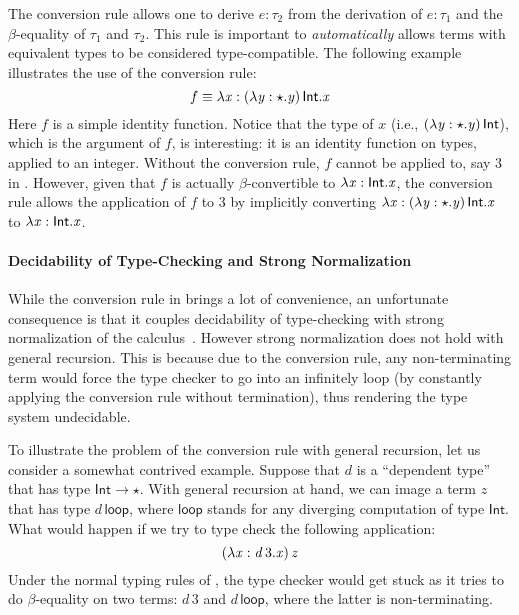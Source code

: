 
The conversion rule allows one to derive $e:\tau_{{\mathrm{2}}}$ from the
derivation of $e:\tau_{{\mathrm{1}}}$ and the $\beta$-equality of $\tau_{{\mathrm{1}}}$ and
$\tau_{{\mathrm{2}}}$. This rule is important to \emph{automatically} allows terms
with equivalent types to be considered type-compatible.  The following
example illustrates the use of the conversion rule:
\[
f \equiv \lambda  \mathit{x}  :  (  \lambda  \mathit{y}  :  \star  .  \mathit{y}  ) \, \mathsf{Int}  .  \mathit{x}
\]
Here $f$ is a simple identity function. Notice that the type of $x$
(i.e., $(  \lambda  \mathit{y}  :  \star  .  \mathit{y}  ) \, \mathsf{Int}$), which is the argument of $f$, is
interesting: it is an identity function on types, applied to an
integer.  Without the conversion rule, $f$ cannot be applied to, say
$3$ in \coc. However, given that $f$ is actually $\beta$-convertible
to $\lambda  \mathit{x}  :  \mathsf{Int}  .  \mathit{x}$, the conversion rule allows the application of $f$
to $3$ by implicitly converting $\lambda  \mathit{x}  :  (  \lambda  \mathit{y}  :  \star  .  \mathit{y}  ) \, \mathsf{Int}  .  \mathit{x}$ to
$\lambda  \mathit{x}  :  \mathsf{Int}  .  \mathit{x}$.

\paragraph{Decidability of Type-Checking and Strong Normalization} 
While the conversion rule in \coc brings a lot of convenience, an
unfortunate consequence is that it couples decidability of
type-checking with strong normalization of the
calculus~\cite{coc:decidability}.  However strong normalization does
not hold with general recursion. This is because due to the conversion
rule, any non-terminating term would force the type checker to go into
an infinitely loop (by constantly applying the conversion rule without
termination), thus rendering the type system undecidable.

To illustrate the problem of the conversion rule with general
recursion, let us consider a somewhat contrived example. Suppose that
$d$ is a ``dependent type'' that has type $\mathsf{Int}  \rightarrow  \star$. With
general recursion at hand, we can image a term $z$ that has type
$d\,\mathsf{loop}$, where $\mathsf{loop}$ stands for any diverging
computation of type $ \mathsf{Int} $. What would happen if we try to type
check the following application: \[ (  \lambda  \mathit{x}  :  \mathit{d} \, 3  .  \mathit{x}  ) \, \mathit{z}\]
Under the normal typing rules of \coc, the type checker would get
stuck as it tries to do $\beta$-equality on two terms: $d\,3$ and
$d\,\mathsf{loop}$, where the latter is non-terminating.   

